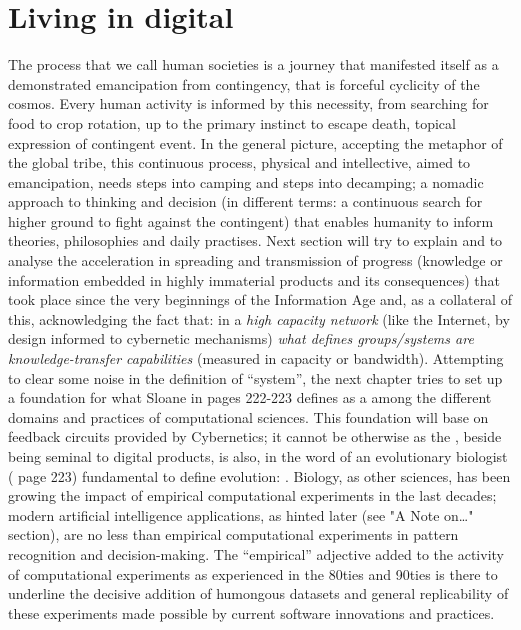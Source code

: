 \documentclass[14pt]{extarticle}
\begin{document}
\section*{Living in digital}%
\label{sec:digital}%

\hspace*{15mm}The process that we call human societies is a journey that manifested itself as a demonstrated emancipation from contingency, that is forceful cyclicity of the cosmos. Every human activity is informed by this necessity, from searching for food to crop rotation, up to the primary instinct to escape death, topical expression of contingent event.
\newline
In the general picture, accepting the metaphor of the global tribe, this continuous process, physical and intellective, aimed to emancipation, needs steps into camping and steps into decamping; a nomadic approach to thinking and decision (in different terms: a continuous search for higher ground to fight against the contingent) that enables humanity to inform theories, philosophies and daily practises.
\newline
\hspace*{15mm}Next section will try to explain and to analyse the acceleration in spreading and transmission of progress (knowledge or information embedded in highly immaterial products and its consequences) that took place since the very beginnings of the Information Age and, as a collateral of this, acknowledging the fact that: in a \textit{high capacity network} (like the Internet, by design informed to cybernetic mechanisms) \textit{what defines groups/systems are knowledge-transfer capabilities} (measured in capacity or bandwidth). Attempting to clear some noise in the definition of “system”, the next chapter tries to set up a foundation for what Sloane in \cite{SLOANdarwin} pages 222-223 defines as a  among the different domains and practices of computational sciences. This foundation will base on feedback circuits provided by Cybernetics; it cannot be otherwise as the , beside being seminal to digital products, is also, in the word of an evolutionary biologist (\cite{SLOANdarwin} page 223) fundamental to define evolution: . Biology, as other sciences, has been growing the impact of empirical computational experiments in the last decades; modern artificial intelligence applications, as hinted later (see "A Note on…" section), are no less than empirical computational experiments in pattern recognition and decision-making. The “empirical” adjective added to the activity of computational experiments as experienced in the 80ties and 90ties is there to underline the decisive addition of humongous datasets and general replicability of these experiments made possible by current software innovations and practices.
\end{document}
